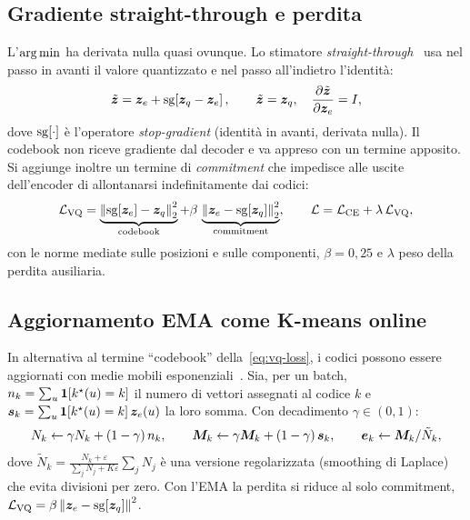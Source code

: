 \subsection{Gradiente straight-through e perdita}

L'$\operatorname*{arg\,min}$ ha derivata nulla quasi ovunque. Lo stimatore
\emph{straight-through}~\cite{bengio2013straight} usa nel passo in avanti il valore quantizzato
e nel passo all'indietro l'identità:
\begin{equation}
  \tilde{\bm{z}}=\bm{z}_e+\operatorname{sg}\!\left[\bm{z}_q-\bm{z}_e\right],
  \qquad
  \tilde{\bm{z}}=\bm{z}_q,\quad
  \frac{\partial\tilde{\bm{z}}}{\partial\bm{z}_e}=I,
  \label{eq:straight-through}
\end{equation}
dove $\operatorname{sg}[\cdot]$ è l'operatore \emph{stop-gradient} (identità in avanti, derivata nulla). Il
codebook non riceve gradiente dal decoder e va appreso con un termine apposito. Si aggiunge
inoltre un termine di \emph{commitment} che impedisce alle uscite dell'encoder di allontanarsi
indefinitamente dai codici:
\begin{equation}
  \mathcal{L}_{\mathrm{VQ}}=
  \underbrace{\left\lVert \operatorname{sg}[\bm{z}_e]-\bm{z}_q \right\rVert_2^2}_{\text{codebook}}
  +\beta\,\underbrace{\left\lVert \bm{z}_e-\operatorname{sg}[\bm{z}_q] \right\rVert_2^2}_{\text{commitment}},
  \qquad
  \mathcal{L}=\mathcal{L}_{\mathrm{CE}}+\lambda\,\mathcal{L}_{\mathrm{VQ}},
  \label{eq:vq-loss}
\end{equation}
con le norme mediate sulle posizioni e sulle componenti, $\beta=0{,}25$ e $\lambda$ peso della
perdita ausiliaria.

\subsection{Aggiornamento EMA come K-means online}

In alternativa al termine \enquote{codebook} della~\eqref{eq:vq-loss}, i codici possono essere
aggiornati con medie mobili esponenziali~\cite{vandenoord2017vqvae,razavi2019vqvae2}. Sia, per
un batch, $n_k=\sum_u\mathbf{1}[k^\star(u)=k]$ il numero di vettori assegnati al codice $k$ e
$\bm{s}_k=\sum_u\mathbf{1}[k^\star(u)=k]\,\bm{z}_e(u)$ la loro somma. Con decadimento
$\gamma\in(0,1)$:
\begin{equation}
  N_k\leftarrow\gamma N_k+(1-\gamma)\,n_k,\qquad
  \bm{M}_k\leftarrow\gamma\bm{M}_k+(1-\gamma)\,\bm{s}_k,\qquad
  \bm{e}_k\leftarrow\bm{M}_k/\tilde N_k ,
  \label{eq:vq-ema}
\end{equation}
dove $\tilde N_k=\frac{N_k+\varepsilon}{\sum_j N_j+K\varepsilon}\sum_jN_j$ è una versione
regolarizzata (smoothing di Laplace) che evita divisioni per zero. Con l'EMA la perdita si
riduce al solo commitment, $\mathcal{L}_{\mathrm{VQ}}=\beta\left\lVert \bm{z}_e-\operatorname{sg}[\bm{z}_q] \right\rVert^2$.

